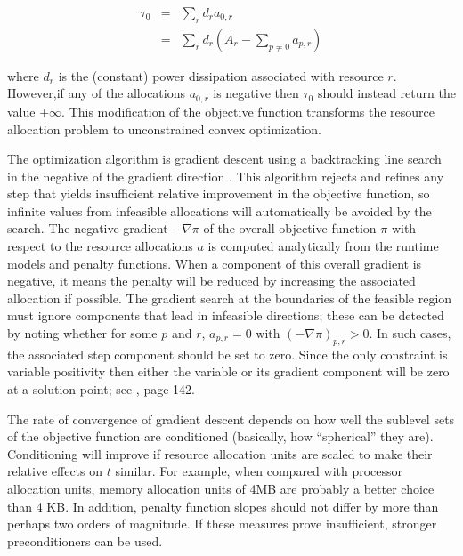 \begin{eqnarray*}
\tau_0 &=& \sum_r d_r a_{0,r}     \\
       &=& \sum_r d_r ( A_r - \sum_{p \neq 0} a_{p,r} )
\end{eqnarray*}

where $d_r$ is the (constant) power dissipation associated with resource $r$.
However,if any of the allocations $a_{0,r}$ is negative then $\tau_0$  should instead return the value $+\infty$.
This modification of the objective function transforms the resource allocation problem
to unconstrained convex optimization.

The optimization algorithm is gradient descent using a backtracking line search in the negative of the gradient direction \cite{BV}.
This algorithm rejects and refines any step that yields insufficient relative improvement in the objective function,
so infinite values from infeasible allocations will automatically be avoided by the search.
The negative gradient $-\nabla\pi$ of the overall objective function $\pi$
with respect to the resource allocations $a$
is computed analytically from the runtime models and penalty functions.
When a component of this overall gradient is negative,
it means the penalty will be reduced by increasing the associated allocation if possible.
The gradient search at the boundaries of the feasible region
must ignore components that lead in infeasible directions;
these can be detected by noting whether for some $p$ and $r$, $a_{p,r} = 0$ with $(-\nabla\pi)_{p,r} > 0$.
In such cases, the associated step component should be set to zero.
Since the only constraint is variable positivity
then either the variable or its gradient component will be zero at a solution point; see \cite{BV}, page 142.

The rate of convergence of gradient descent depends on how well the sublevel sets of the objective function
are conditioned (basically, how “spherical” they are).
Conditioning will improve if resource allocation units are scaled to make their relative effects on $t$ similar.
For example, when compared with processor allocation units,
memory allocation units of 4MB are probably a better choice than 4 KB.
In addition, penalty function slopes should not differ by more than perhaps two orders of magnitude.
If these measures prove insufficient, stronger preconditioners can be used.
